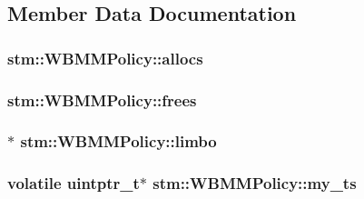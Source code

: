 \subsection{Member Data Documentation}
\hypertarget{classstm_1_1WBMMPolicy_a7ccd2760f4092231d9b774fa41b5e8e1}{
\subsubsection[{allocs}]{ stm\-::\-W\-B\-M\-M\-Policy\-::allocs\hspace{0.3cm}{\ttfamily [private]}}}\label{classstm_1_1WBMMPolicy_a7ccd2760f4092231d9b774fa41b5e8e1}
\hypertarget{classstm_1_1WBMMPolicy_a4ead96a9d3a33ea2c60a6802b92d8556}{
\subsubsection[{frees}]{ stm\-::\-W\-B\-M\-M\-Policy\-::frees\hspace{0.3cm}{\ttfamily [private]}}}\label{classstm_1_1WBMMPolicy_a4ead96a9d3a33ea2c60a6802b92d8556}
\hypertarget{classstm_1_1WBMMPolicy_a0cf9e5b57ea9e60678c86b2183e796ff}{
\subsubsection[{limbo}]{$\ast$ stm\-::\-W\-B\-M\-M\-Policy\-::limbo\hspace{0.3cm}{\ttfamily [private]}}}\label{classstm_1_1WBMMPolicy_a0cf9e5b57ea9e60678c86b2183e796ff}
\hypertarget{classstm_1_1WBMMPolicy_a803a32139ca7a6e1144c8758f6607189}{
\subsubsection[{my\-\_\-ts}]{\setlength{\rightskip}{0pt plus 5cm}volatile uintptr\-\_\-t$\ast$ stm\-::\-W\-B\-M\-M\-Policy\-::my\-\_\-ts\hspace{0.3cm}{\ttfamily [private]}}}\label{classstm_1_1WBMMPolicy_a803a32139ca7a6e1144c8758f6607189}

